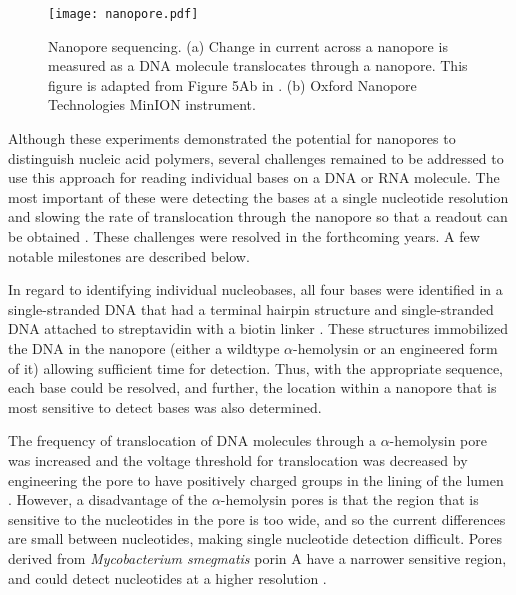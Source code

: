 \begin{figure}[b!]
\centering
\texttt{[image: nanopore.pdf]}
\caption[Nanopore sequencing]{
  Nanopore sequencing.
  (a) Change in current across a nanopore is measured as a DNA molecule
  translocates through a nanopore. This figure is
  adapted from Figure 5Ab in \cite{goodwin2016coming}.
  (b) Oxford Nanopore Technologies MinION instrument.}
\label{nanopore}
\end{figure}

Although these experiments demonstrated the potential for nanopores to
distinguish nucleic acid polymers, several challenges remained to be
addressed to use this approach for reading individual bases on a DNA or
RNA molecule.
%
The most important of these were detecting the bases at a single
nucleotide resolution and slowing the rate of translocation through the
nanopore so that a readout can be obtained
\citep{bayley2015nanopore,branton2010potential}.
%
These challenges were resolved in the forthcoming years. A few notable
milestones are described below.

In regard to identifying individual nucleobases, all four bases were
identified in a single-stranded DNA that had a terminal hairpin
structure \citep{ashkenasy2005recognizing} and single-stranded DNA
attached to streptavidin with a biotin linker
\citep{purnell2009discrimination,stoddart2009single}. These structures
immobilized the DNA in the nanopore (either a wildtype
$\alpha$-hemolysin or an engineered form of it) allowing sufficient time
for detection. Thus, with the appropriate sequence, each base could be
resolved, and further, the location within a nanopore that is most
sensitive to detect bases was also determined.


The frequency of translocation of DNA molecules through a
$\alpha$-hemolysin pore was increased and the voltage threshold for
translocation was decreased by engineering the pore to have positively
charged groups in the lining of the lumen \citep{maglia2008enhanced}.
%
However, a disadvantage of the $\alpha$-hemolysin pores is that the
region that is sensitive to the nucleotides in the pore is too wide, and
so the current differences are small between nucleotides, making single
nucleotide detection difficult.
%
Pores derived from \emph{Mycobacterium smegmatis} porin A have a
narrower sensitive region, and could detect nucleotides at a higher
resolution \citep{butler2008single,manrao2011nucleotide}.

